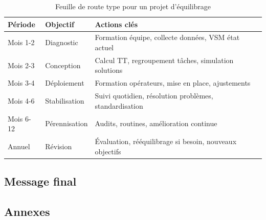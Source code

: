 \documentclass[12pt,a4paper]{article}
\begin{document}
\begin{center}
\begin{table}[H]
\centering
\begin{tabular}{|p{2cm}|p{4cm}|p{6cm}|}
\hline
\textbf{Période} & \textbf{Objectif} & \textbf{Actions clés} \\
\hline
Mois 1-2 & Diagnostic & Formation équipe, collecte données, VSM état actuel \\
\hline
Mois 2-3 & Conception & Calcul TT, regroupement tâches, simulation solutions \\
\hline
Mois 3-4 & Déploiement & Formation opérateurs, mise en place, ajustements \\
\hline
Mois 4-6 & Stabilisation & Suivi quotidien, résolution problèmes, standardisation \\
\hline
Mois 6-12 & Pérennisation & Audits, routines, amélioration continue \\
\hline
Annuel & Révision & Évaluation, rééquilibrage si besoin, nouveaux objectifs \\
\hline
\end{tabular}
\caption{Feuille de route type pour un projet d'équilibrage}
\end{table}

\subsection{Message final}

\begin{center}
\end{center}

\subsection{Annexes}


\end{center}
\end{document}
